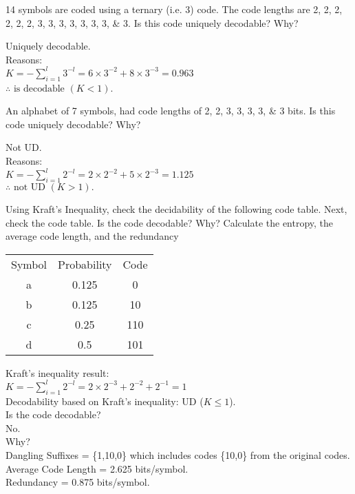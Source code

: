 \begin{question}
14 symbols are coded using a ternary (i.e. 3) code. The code lengths are 2, 2, 2, 2, 2, 2, 3, 3, 3, 3, 3, 3, 3, \& 3. Is this code uniquely decodable? Why?
\end{question}
\begin{solution}
Uniquely decodable. \\
Reasons: \\
$K = - \sum_{i=1}^{l} 3^{-l} = 6 \times 3^{-2} + 8 \times 3^{-3} = 0.963$ \\
$\therefore \text{ is decodable } (K<1)$.
\end{solution}


\begin{question}
An alphabet of 7 symbols, had code lengths of 2, 2, 3, 3, 3, 3, \& 3 bits. Is this code uniquely decodable? Why?
\end{question}
\begin{solution}
Not UD. \\
Reasons: \\
$K = - \sum_{i=1}^{l} 2^{-l} = 2 \times 2^{-2} + 5 \times 2^{-3} = 1.125$ \\
$ \therefore \text{ not UD } (K>1).$ \\

\end{solution}


\begin{question}
Using Kraft’s Inequality, check the decidability of the
following code table. Next, check the code table. Is the
code decodable? Why? Calculate the entropy, the average
code length, and the redundancy
\begin{table}[h]
\renewcommand{\arraystretch}{1.3}
\centering
\begin{tabular}{c|c|c}
\hline
Symbol & Probability & Code \\
a & 0.125 & 0 \\
b & 0.125 & 10 \\
c & 0.25 & 110 \\
d & 0.5 & 101 \\
\hline
\end{tabular}
\end{table}

\end{question}
\begin{solution}
Kraft’s inequality result: \\
$K = - \sum_{i=1}^{l} 2^{-l} = 2 \times 2^{-3} + 2^{-2} + 2^{-1} = 1$ \\
Decodability based on Kraft’s inequality: UD ($K\leq1$).\\
Is the code decodable? \\ 
No. \\
Why? \\
Dangling Suffixes = \{1,10,0\} which includes codes \{10,0\} from the original codes.\\
Average Code Length = 2.625 bits/symbol. \\
Redundancy = 0.875 bits/symbol.
\end{solution}


